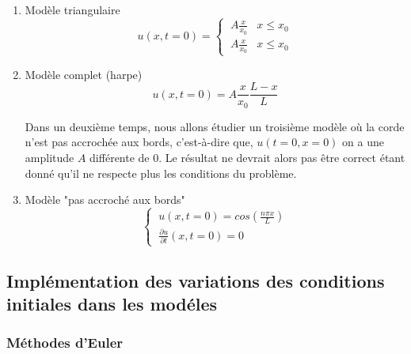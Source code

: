 \begin{enumerate}
    \item Modèle triangulaire
    \begin{equation}
       u(x,t=0)=\left\{
            \begin{array}{ll}
               \ A \frac{x}{x_{0}} &  x\leq x_{0} \\
               \ A \frac{x}{x_{0}} &  x\leq x_{0}
            \end{array}
        \right.
    \end{equation}
    
    
    \item Modèle complet (harpe)
    \begin{equation}
        u(x,t=0)=A\frac{x}{x_{0}}\frac{L-x}{L}
    \end{equation}
    
Dans un deuxième temps, nous allons étudier un troisième modèle où la corde n'est pas accrochée aux bords, c'est-à-dire que, $u(t=0,x=0)$ on a une amplitude $A$ différente de $0$. Le résultat ne devrait alors pas être correct étant donné qu'il ne respecte plus les conditions du problème.
\newline

 \item Modèle "pas accroché aux bords"
    \begin{equation}
       \left\{
            \begin{array}{ll}
               \  u(x,t=0)=cos(\frac{n \pi x}{L})  \\
               \ \frac{\partial{u}}{\partial{t}}(x,t=0)=0 
            \end{array}
        \right.
    \end{equation}
    
    
    
    
    
    
\end{enumerate}


\vspace*{2cm}
\subsection{Implémentation des variations des conditions initiales dans les modéles}


\subsubsection{Méthodes d'Euler}

